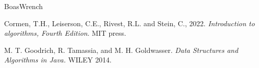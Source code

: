 \documentclass[dvipsnames]{article}
\begin{document}













\begin{thebibliography}{BoasWrench}

Cormen, T.H., Leiserson, C.E., Rivest, R.L. and Stein, C., 2022. \emph{Introduction to algorithms, Fourth Edition}. MIT press.

M. T. Goodrich, R. Tamassia, and M. H. Goldwasser. \emph{Data Structures and Algorithms in Java.} WILEY 2014.

\end{thebibliography}
\end{document}
